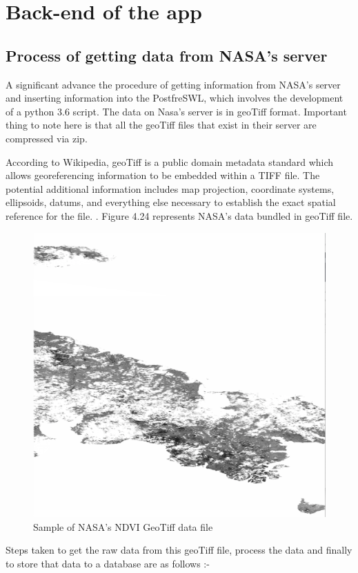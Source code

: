 \section{Back-end of the app}


\subsection{Process of getting data from NASA's server}

A significant advance the procedure of getting information from NASA's server and inserting information into the PostfreSWL, which involves the development of a python 3.6 script. The data on Nasa's server is in \gls{geoTiff} format. Important thing to note here is that all the \gls{geoTiff} files that exist in their server are compressed via zip.


According to Wikipedia, \gls{geoTiff} is a public domain metadata standard which allows georeferencing information to be embedded within a TIFF file. The potential additional information includes map projection, coordinate systems, ellipsoids, datums, and everything else necessary to establish the exact spatial reference for the file. \cite{GeoTIFF_Wikipedia}. Figure 4.24 represents NASA's data bundled in \gls{geoTiff} file.

    \begin{figure}[H]
            \centering
            \includegraphics[width=0.35\linewidth]{figures/ch4/geotiff.png}
            \caption{\label{fig:geotiff} Sample of NASA's NDVI GeoTiff data file}
    \end{figure}

    Steps taken to get the raw data from this \gls{geoTiff} file, process the data and finally to store that data to a database are as follows :-
    
